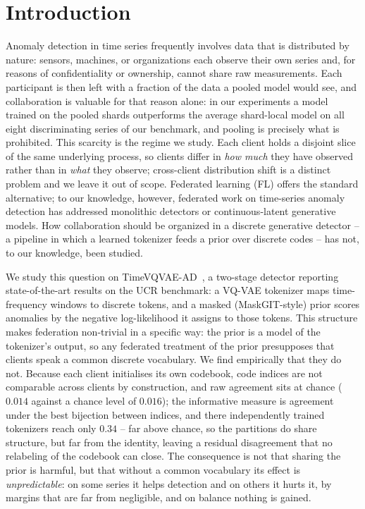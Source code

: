 
\section{Introduction}

Anomaly detection in time series frequently involves data that is distributed by nature:
sensors, machines, or organizations each observe their own series and, for reasons of
confidentiality or ownership, cannot share raw measurements. Each participant is then left
with a fraction of the data a pooled model would see, and collaboration is valuable for that
reason alone: in our experiments a model trained on the pooled shards outperforms the average
shard-local model on all eight discriminating series of our benchmark, and pooling is
precisely what is prohibited. This scarcity is the regime we study. Each client holds a
disjoint slice of the same underlying process, so clients differ in \emph{how much} they have
observed rather than in \emph{what} they observe; cross-client distribution shift is a
distinct problem and we leave it out of scope. Federated learning (FL) offers the standard
alternative; to our knowledge, however, federated work on time-series anomaly detection has
addressed monolithic detectors or continuous-latent generative models.%
How collaboration should be organized in a discrete generative detector -- a pipeline in
which a learned tokenizer feeds a prior over discrete codes -- has not, to our knowledge,
been studied.

We study this question on TimeVQVAE-AD~\citep{lee2024timevqvaead}, a two-stage detector
reporting state-of-the-art results on the UCR benchmark: a VQ-VAE tokenizer maps
time-frequency windows to discrete tokens, and a masked (MaskGIT-style) prior scores
anomalies by the negative log-likelihood it assigns to those tokens. This structure makes
federation non-trivial in a specific way: the prior is a model of the tokenizer's output, so
any federated treatment of the prior presupposes that clients speak a common discrete
vocabulary. We find empirically that they do not. Because each client initialises its own
codebook, code indices are not comparable across clients by construction, and raw agreement
sits at chance ($0.014$ against a chance level of $0.016$); the informative measure is
agreement under the best bijection between indices, and there independently trained
tokenizers reach only $0.34$ -- far above chance, so the partitions do share structure, but
far from the identity, leaving a residual disagreement that no relabeling of the codebook
can close. The consequence is not that sharing the prior is harmful, but that without a
common vocabulary its effect is \emph{unpredictable}: on some series it helps detection and
on others it hurts it, by margins that are far from negligible, and on balance nothing is
gained.

